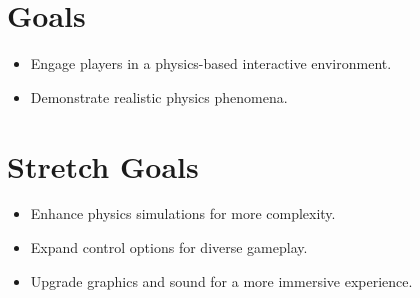 \documentclass{article}
\begin{document}
\section{Goals}
\begin{itemize}
  \item Engage players in a physics-based interactive environment.
  \item Demonstrate realistic physics phenomena.
\end{itemize}

\section{Stretch Goals}
\begin{itemize}
  \item Enhance physics simulations for more complexity.
  \item Expand control options for diverse gameplay.
  \item Upgrade graphics and sound for a more immersive experience.
\end{itemize}
\end{document}
